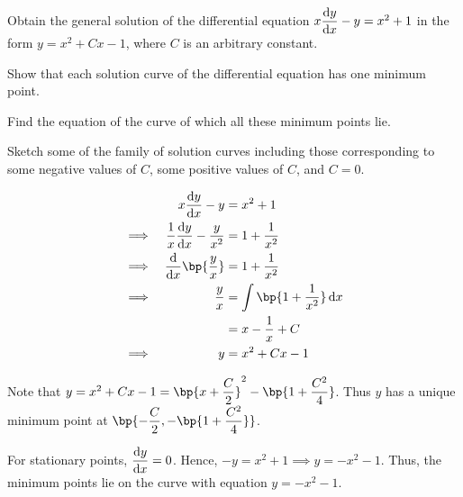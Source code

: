 \documentclass{echw}
\begin{document}
    \problem{}
        Obtain the general solution of the differential equation $x \dfrac{\mathrm{d} y}{\mathrm{d} x} - y = x^2 + 1$ in the form $y = x^2 + Cx - 1$, where $C$ is an arbitrary constant.

        Show that each solution curve of the differential equation has one minimum point.

        Find the equation of the curve of which all these minimum points lie.

        Sketch some of the family of solution curves including those corresponding to some negative values of $C$, some positive values of $C$, and $C = 0$.

    \solution
        \begin{alignat*}{2}
            && x \der{y}{x} - y &= x^2 + 1\\
            \implies&& \dfrac1x \der{y}{x} - \dfrac{y}{x^2} &= 1 + \dfrac1{x^2}\\
            \implies&& \der{}{x} \bp{\dfrac{y}{x}} &= 1 + \dfrac1{x^2}\\
            \implies&& \dfrac{y}{x} &= \int \bp{1 + \dfrac{1}{x^2}} \d x\\
            && &= x - \dfrac1x + C\\
            \implies&& y &= x^2 + Cx - 1
        \end{alignat*}

        Note that $y = x^2 + Cx - 1 = \bp{x + \dfrac{C}{2}}^2 - \bp{1 + \dfrac{C^2}4}$. Thus $y$ has a unique minimum point at $\bp{-\dfrac{C}2, -\bp{1 + \dfrac{C^2}4}}$.

        For stationary points, $\dfrac{\mathrm{d} y}{\mathrm{d} x} = 0$. Hence, $-y = x^2 + 1 \implies y = -x^2 - 1$. Thus, the minimum points lie on the curve with equation $\boxed{y = -x^2 - 1}$.
\end{document}
